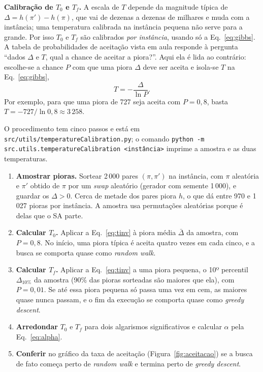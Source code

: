 \textbf{Calibração de $T_0$ e $T_f$.} A escala de $T$ depende da magnitude típica de $\Delta=h(\pi')-h(\pi)$, que vai de dezenas a dezenas de milhares e muda com a instância; uma temperatura calibrada na instância pequena não serve para a grande. Por isso $T_0$ e $T_f$ são calibrados \textit{por instância}, usando só a Eq.~\eqref{eq:gibbs}. A tabela de probabilidades de aceitação vista em aula responde à pergunta ``dados $\Delta$ e $T$, qual a chance de aceitar a piora?''. Aqui ela é lida ao contrário: escolhe-se a chance $P$ com que uma piora $\Delta$ deve ser aceita e isola-se $T$ na Eq.~\eqref{eq:gibbs},
\begin{equation}
  T=-\frac{\Delta}{\ln P}.
  \label{eq:tinv}
\end{equation}
Por exemplo, para que uma piora de 727 seja aceita com $P=0{,}8$, basta $T=-727/\ln 0{,}8\approx3\,258$.

O procedimento tem cinco passos e está em \texttt{src/\allowbreak utils/\allowbreak temperatureCalibration.py}; o comando \texttt{python -m src.utils.\allowbreak temperatureCalibration <instância>} imprime a amostra e as duas temperaturas.

\begin{enumerate}
  \item \textbf{Amostrar pioras.} Sortear 2\,000 pares $(\pi,\pi')$ na instância, com $\pi$ aleatória e $\pi'$ obtido de $\pi$ por um \textit{swap} aleatório (gerador com semente 1\,000), e guardar os $\Delta>0$. Cerca de metade dos pares piora $h$, o que dá entre 970 e 1\,027 pioras por instância. A amostra usa permutações aleatórias porque é delas que o SA parte.
  \item \textbf{Calcular $T_0$.} Aplicar a Eq.~\eqref{eq:tinv} à piora média $\bar\Delta$ da amostra, com $P=0{,}8$. No início, uma piora típica é aceita quatro vezes em cada cinco, e a busca se comporta quase como \textit{random walk}.
  \item \textbf{Calcular $T_f$.} Aplicar a Eq.~\eqref{eq:tinv} a uma piora pequena, o 10º percentil $\Delta_{10\%}$ da amostra (90\% das pioras sorteadas são maiores que ela), com $P=0{,}01$. Se até essa piora pequena só passa uma vez em cem, as maiores quase nunca passam, e o fim da execução se comporta quase como \textit{greedy descent}.
  \item \textbf{Arredondar} $T_0$ e $T_f$ para dois algarismos significativos e calcular $\alpha$ pela Eq.~\eqref{eq:alpha}.
  \item \textbf{Conferir} no gráfico da taxa de aceitação (Figura~\ref{fig:aceitacao}) se a busca de fato começa perto de \textit{random walk} e termina perto de \textit{greedy descent}.
\end{enumerate}


